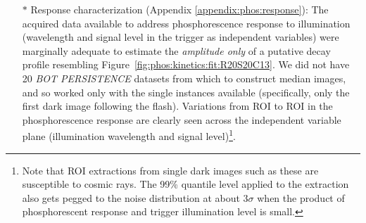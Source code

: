 \begin{itemize}
    \item[$\ast$] Response characterization (Appendix \ref{appendix:phos:response}): The acquired data available to address phosphorescence response to illumination (wavelength and signal level in the trigger as independent variables) were marginally adequate to estimate the {\it amplitude only} of a putative decay profile resembling Figure~\ref{fig:phos:kinetics:fit:R20S20C13}. We did not have 20 {\it BOT PERSISTENCE} datasets from which to construct median images, and so worked only with the single instances available (specifically, only the first dark image following the flash). Variations from ROI to ROI in the phosphorescence response are clearly seen across the independent variable plane (illumination wavelength and signal level)\footnote{Note that ROI extractions from single dark images such as these are susceptible to cosmic rays. The 99\% quantile level applied to the extraction also gets pegged to the noise distribution at about $3\sigma$ when the product of phosphorescent response and trigger illumination level is small.}.
\end{itemize}


\clearpage

\clearpage

\clearpage

\clearpage

\clearpage
